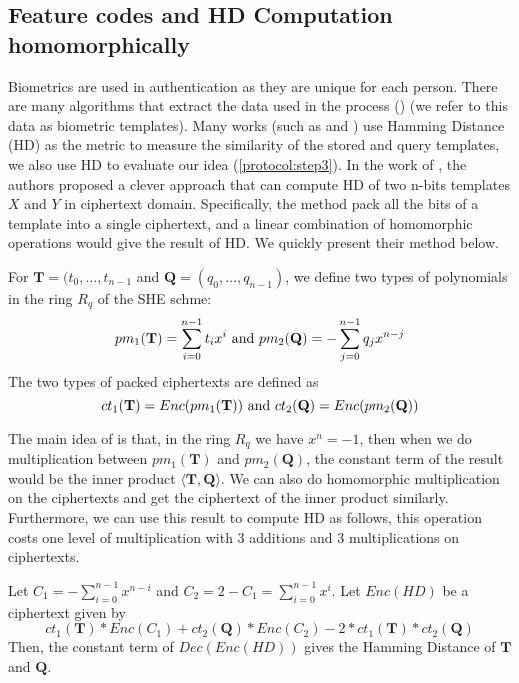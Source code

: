 \subsection{Feature codes and HD Computation homomorphically}
\label{sec:HDComp}
Biometrics are used in authentication as they are unique for each person. There are
many algorithms that extract the data used in the process (\cite{FVConGoi2:online})
(we refer to this data as biometric templates). Many works (such as
\cite{daugman2003importance} and \cite{FujitsuD7:online}) use Hamming Distance (HD)
as the metric to measure the similarity of the stored and query templates, we also
use HD to evaluate our idea (\ref{protocol:step3}). In the work of
\cite{yasuda2014practical}, the authors proposed a clever approach that can compute
HD of two n-bits templates $X$ and $Y$ in ciphertext domain. Specifically, the
method pack all the bits of a template into a single ciphertext, and a linear
combination of homomorphic operations would give the result of HD. We quickly
present their method below.
\begin{definition}
For $\mathbf{T} = (t_0, \dots,
t_{n-1}$ and $\mathbf{Q} = (q_0, \dots, q_{n-1})$, we define two types of polynomials in the ring $R_q$ of the SHE schme:
\[
pm_1(\mathbf{T}) = \sum_{i=0}^{n-1}t_ix^i
\ \textnormal{and} \ pm_2(\mathbf{Q}) =
- \sum_{j=0}^{n-1}q_jx^{n-j}
\]
The two types of packed ciphertexts are defined as
\[
ct_{1}(\mathbf{T}) = Enc(pm_1(\mathbf{T}))
\ \textnormal{and} \
ct_{2}(\mathbf{Q}) = Enc(pm_2(\mathbf{Q}))
\]
\end{definition}
The main idea of \cite{yasuda2014practical} is that, in the ring $R_q$ we have $x^n = -1$, then when we do multiplication between $pm_1(\mathbf{T})$ and $pm_2(\mathbf{Q})$, the constant term of the result would be the inner product $\langle \mathbf{T}, \mathbf{Q}\rangle$. We can also do homomorphic multiplication on the ciphertexts and get the ciphertext of the inner product similarly. Furthermore, we can use this result to compute HD as follows, this operation costs one level of multiplication with 3 additions and 3 multiplications on ciphertexts.

\begin{theorem}
Let $C_1 = - \sum_{i=0}^{n-1}x^{n-i}$ and
$C_2 = 2 - C_1 = \sum_{i=0}^{n-1}x^i$. Let $Enc(HD)$ be a ciphertext given by
\[
ct_1(\mathbf{T})*Enc(C_1) + ct_2(\mathbf{Q})*
Enc(C_2) - 2*ct_1(\mathbf{T})*ct_2(\mathbf{Q})
\]
Then, the constant term of $Dec(Enc(HD))$ gives the Hamming Distance of $\mathbf{T}$ and $\mathbf{Q}$.
\end{theorem}

